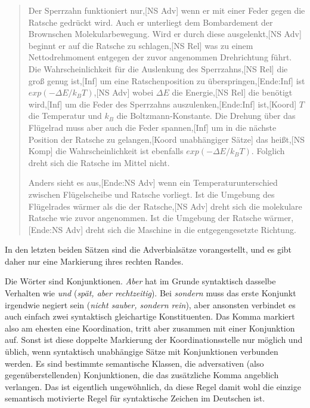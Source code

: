\begin{sloppypar}
\begin{quote}
Der Sperrzahn funktioniert nur,[NS Adv] wenn er mit einer Feder gegen die Ratsche gedrückt wird.
Auch er unterliegt dem Bombardement der Brownschen Molekularbewegung.
Wird er durch diese ausgelenkt,[NS Adv] beginnt er auf die Ratsche zu schlagen,[NS Rel] was zu einem Nettodrehmoment entgegen der zuvor angenommen Drehrichtung führt.
Die Wahrscheinlichkeit für die Auslenkung des Sperrzahns,[NS Rel] die groß genug ist,[Inf] um eine Ratschenposition zu überspringen,[Ende:Inf] ist $exp(-\Delta E/k_BT)$,[NS Adv] wobei $\Delta E$ die Energie,[NS Rel] die benötigt wird,[Inf] um die Feder des Sperrzahns auszulenken,[Ende:Inf] ist,[Koord] $T$ die Temperatur und $k_B$ die Boltzmann-Konstante.
Die Drehung über das Flügelrad muss aber auch die Feder spannen,[Inf] um in die nächste Position der Ratsche zu gelangen,[Koord unabhängiger Sätze] das heißt,[NS Komp] die Wahrscheinlichkeit ist ebenfalls $exp(-\Delta E/k_BT)$.
Folglich dreht sich die Ratsche im Mittel nicht.

Anders sieht es aus,[Ende:NS Adv] wenn ein Temperaturunterschied zwischen Flügelscheibe und Ratsche vorliegt.
Ist die Umgebung des Flügelrades wärmer als die der Ratsche,[NS Adv] dreht sich die molekulare Ratsche wie zuvor angenommen.
Ist die Umgebung der Ratsche wärmer,[Ende:NS Adv] dreht sich die Maschine in die entgegengesetzte Richtung.
\end{quote}
\end{sloppypar}

In den letzten beiden Sätzen sind die Adverbialsätze vorangestellt, und es gibt daher nur eine Markierung ihres rechten Randes.

 Die Wörter sind Konjunktionen.
\textit{Aber} hat im Grunde syntaktisch dasselbe Verhalten wie \textit{und} (\textit{spät, aber rechtzeitig}).
Bei \textit{sondern} muss das erste Konjunkt irgendwie negiert sein (\textit{nicht sauber, sondern rein}), aber ansonsten verbindet es auch einfach zwei syntaktisch gleichartige Konstituenten.
Das Komma markiert also am ehesten eine Koordination, tritt aber zusammen mit einer Konjunktion auf.
Sonst ist diese doppelte Markierung der Koordinationsstelle nur möglich und üblich, wenn syntaktisch unabhängige Sätze mit Konjunktionen verbunden werden.
Es sind bestimmte semantische Klassen, \zB die adversativen (also gegenüberstellenden) Konjunktionen, die das zusätzliche Komma angeblich verlangen.
Das ist eigentlich ungewöhnlich, da diese Regel damit wohl die einzige semantisch motivierte Regel für syntaktische Zeichen im Deutschen ist.

